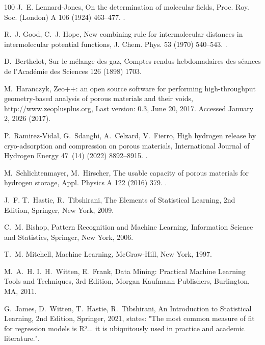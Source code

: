 \documentclass[review]{elsarticle}
\begin{document}
\begin{thebibliography}{100}
J.~E. Lennard-Jones, On the determination of molecular fields, Proc. Roy. Soc.
  (London) A 106 (1924) 463--477.
\newblock \href {https://doi.org/10.1098/rspa.1924.0082}
  {}.

R.~J. Good, C.~J. Hope, New combining rule for intermolecular distances in
  intermolecular potential functions, J. Chem. Phys. 53 (1970) 540--543.
\newblock \href {https://doi.org/10.1063/1.1674022}
  {}.

D.~Berthelot, Sur le m\'elange des gaz, Comptes rendus hebdomadaires des
  s\'eances de l'Acad\'emie des Sciences 126 (1898) 1703.

M.~Haranczyk, {Zeo++}: an open source software for performing high-throughput
  geometry-based analysis of porous materials and their voids,
  http://www.zeoplusplus.org, {Last version: 0.3, June 20, 2017. Accessed
  January 2, 2026} (2017).

P.~Ramirez-Vidal, G.~Sdanghi, A.~Celzard, V.~Fierro, High hydrogen release by
  cryo-adsorption and compression on porous materials, International Journal of
  Hydrogen Energy 47~(14) (2022) 8892--8915.
\newblock \href {https://doi.org/10.1016/j.ijhydene.2021.12.235}
  {}.

M.~Schlichtenmayer, M.~Hirscher, The usable capacity of porous materials for
  hydrogen storage, Appl. Physics A 122 (2016) 379.
\newblock \href {https://doi.org/10.1007/s00339-016-9864-6}
  {}.

J.~F. T.~Hastie, R.~Tibshirani, The Elements of Statistical Learning, 2nd
  Edition, Springer, New York, 2009.

C.~M. Bishop, Pattern Recognition and Machine Learning, Information Science and
  Statistics, Springer, New York, 2006.

T.~M. Mitchell, Machine Learning, McGraw-Hill, New York, 1997.

M.~A.~H. I.~H.~Witten, E.~Frank, Data Mining: Practical Machine Learning Tools
  and Techniques, 3rd Edition, Morgan Kaufmann Publishers, Burlington, MA,
  2011.

G.~James, D.~Witten, T.~Hastie, R.~Tibshirani, An Introduction to Statistical
  Learning, 2nd Edition, Springer, 2021, states: "The most common measure of
  fit for regression models is R²... it is ubiquitously used in practice and
  academic literature.".


\end{thebibliography}
\end{document}
